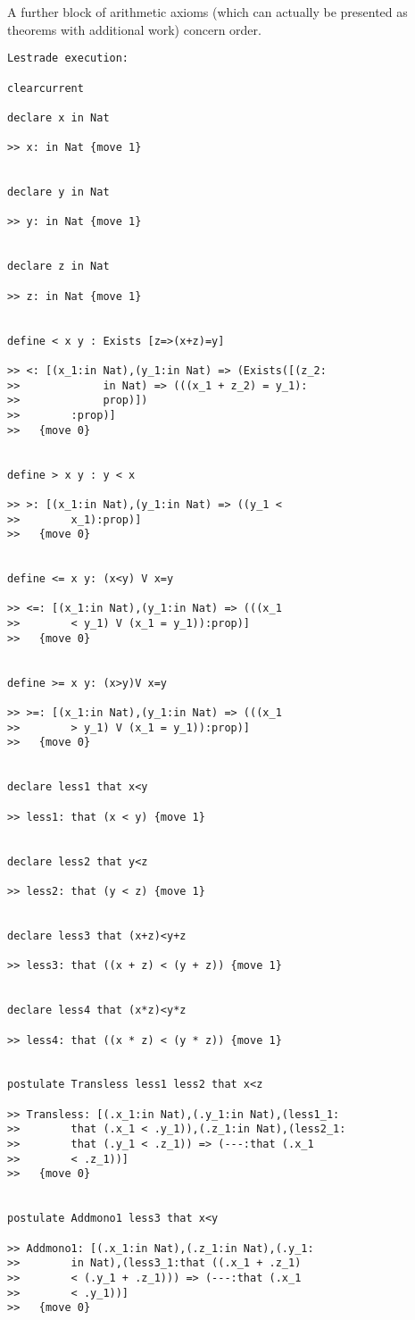 \documentclass[12pt]{article}
\begin{document}
A further block of arithmetic axioms (which can actually be presented as theorems with additional work) concern order.

\begin{verbatim}Lestrade execution:

clearcurrent

declare x in Nat

>> x: in Nat {move 1}


declare y in Nat

>> y: in Nat {move 1}


declare z in Nat

>> z: in Nat {move 1}


define < x y : Exists [z=>(x+z)=y]

>> <: [(x_1:in Nat),(y_1:in Nat) => (Exists([(z_2:
>>             in Nat) => (((x_1 + z_2) = y_1):
>>             prop)])
>>        :prop)]
>>   {move 0}


define > x y : y < x

>> >: [(x_1:in Nat),(y_1:in Nat) => ((y_1 < 
>>        x_1):prop)]
>>   {move 0}


define <= x y: (x<y) V x=y

>> <=: [(x_1:in Nat),(y_1:in Nat) => (((x_1 
>>        < y_1) V (x_1 = y_1)):prop)]
>>   {move 0}


define >= x y: (x>y)V x=y

>> >=: [(x_1:in Nat),(y_1:in Nat) => (((x_1 
>>        > y_1) V (x_1 = y_1)):prop)]
>>   {move 0}


declare less1 that x<y

>> less1: that (x < y) {move 1}


declare less2 that y<z

>> less2: that (y < z) {move 1}


declare less3 that (x+z)<y+z

>> less3: that ((x + z) < (y + z)) {move 1}


declare less4 that (x*z)<y*z

>> less4: that ((x * z) < (y * z)) {move 1}


postulate Transless less1 less2 that x<z

>> Transless: [(.x_1:in Nat),(.y_1:in Nat),(less1_1:
>>        that (.x_1 < .y_1)),(.z_1:in Nat),(less2_1:
>>        that (.y_1 < .z_1)) => (---:that (.x_1 
>>        < .z_1))]
>>   {move 0}


postulate Addmono1 less3 that x<y

>> Addmono1: [(.x_1:in Nat),(.z_1:in Nat),(.y_1:
>>        in Nat),(less3_1:that ((.x_1 + .z_1) 
>>        < (.y_1 + .z_1))) => (---:that (.x_1 
>>        < .y_1))]
>>   {move 0}



\end{verbatim}
\end{document}
